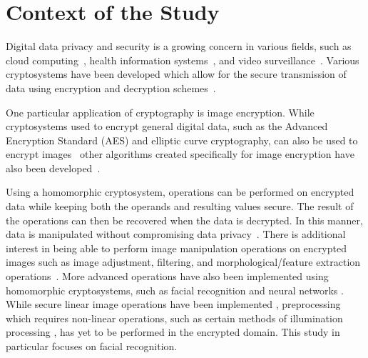 
\section{Context of the Study}

Digital data privacy and security is a growing concern in various fields, such as cloud computing~\cite{potey_homomorphic_2016}, health information systems~\cite{kester_cryptographic_2015}, and video surveillance~\cite{upmanyu_efficient_2009}. Various cryptosystems have been developed which allow for the secure transmission of data using encryption and decryption schemes~\cite{bauer_cryptosystem_2005}.

One particular application of cryptography is image encryption. While cryptosystems used to encrypt general digital data, such as the Advanced Encryption Standard (AES) and elliptic curve cryptography, can also be used to encrypt images~\cite{jain_image_2016, singh_image_2015} other algorithms created specifically for image encryption have also been developed~\cite{murugan_survey_2018}.

 Using a homomorphic cryptosystem, operations can be performed on encrypted data while keeping both the operands and resulting values secure. The result of the operations can then be recovered when the data is decrypted. In this manner, data is manipulated without compromising data privacy~\cite{fontaine_survey_2007, sen_homomorphic_2013}. There is additional interest in being able to perform image manipulation operations on encrypted images such as image adjustment, filtering, and morphological/feature extraction operations~\cite{ziad_cryptoimg:_2016, gonzalez_digital_2008}. More advanced operations have also been implemented using homomorphic cryptosystems, such as facial recognition \cite{hutchison_privacy-preserving_2009} and neural networks \cite{hesamifard_cryptodl:_2017}. While secure linear image operations have been implemented \cite{ziad_cryptoimg:_2016}, preprocessing which requires non-linear operations, such as certain methods of illumination processing \cite{oravec_illumination_2010}, has yet to be performed in the encrypted domain. This study in particular focuses on facial recognition. 
